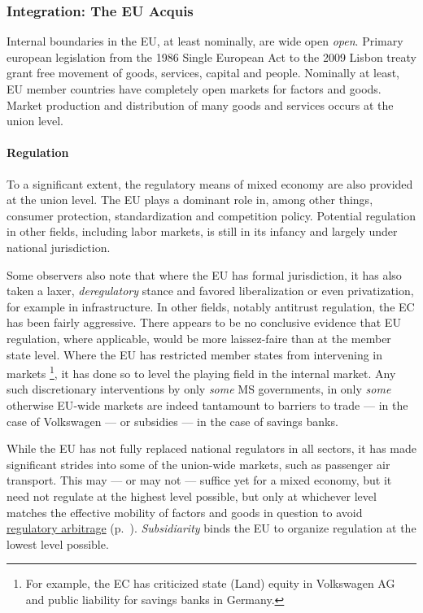 \documentclass[11pt,a4paper,oneside]{article}
\begin{document}
\subsubsection[Integration]{Integration: The EU Acquis} \label{sec:EU-Acquis}
Internal boundaries in the \gls{EU}, at least nominally, are wide open \emph{open}. %
Primary european legislation from the 1986 Single European Act to the 2009 Lisbon treaty grant free movement of goods, services, capital and people. 
Nominally at least, \gls{EU} member countries have completely open markets for factors and goods. 
Market production and distribution of many goods and services occurs at the union level.

\paragraph{Regulation} To a significant extent, the regulatory means of mixed economy are also provided at the union level. 
The \gls{EU} plays a dominant role in, among other things, consumer protection, standardization and competition policy. 
Potential regulation in other fields, including labor markets, is still in its infancy and largely under national jurisdiction. %

Some observers also note that where the \gls{EU} has formal jurisdiction, it has also taken a laxer, \emph{deregulatory} stance and favored liberalization or even privatization, for example in infrastructure. %
In other fields, notably antitrust regulation, the \gls{EC} has been fairly aggressive. 
There appears to be no conclusive evidence that \gls{EU} regulation, where applicable, would be more laissez-faire than at the member state level. %
Where the \gls{EU} has restricted member states from intervening in markets
	\footnote{
		For example, the \gls{EC} has criticized state (Land) equity in Volkswagen AG and public liability for savings banks in Germany.
	}, 
it has done so to level the playing field in the internal market. 
Any such discretionary interventions by only \emph{some} \gls{MS} governments, in only \emph{some} otherwise \gls{EU}-wide markets are indeed tantamount to barriers to trade --- in the case of Volkswagen --- or subsidies --- in the case of savings banks.  %

While the \gls{EU} has not fully replaced national regulators in all sectors, it has made significant strides into some of the union-wide markets, such as passenger air transport. 
This may --- or may not --- suffice yet for a mixed economy, but it need not regulate at the highest level possible, but only at whichever level matches the effective mobility of factors and goods in question to avoid \hyperref[sec:regulatory]{regulatory arbitrage} (p.~\pageref{sec:regulatory}). 
\emph{Subsidiarity} binds the \gls{EU} to organize regulation at the lowest level possible.
\end{document}
